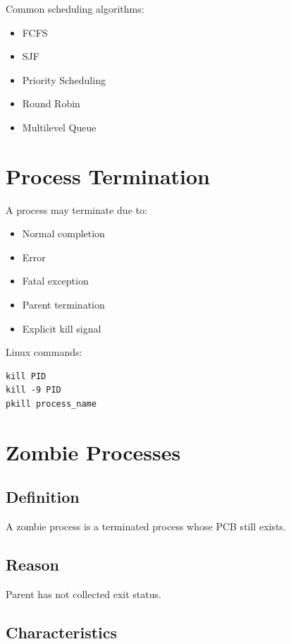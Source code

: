 Common scheduling algorithms:

\begin{itemize}
\item FCFS
\item SJF
\item Priority Scheduling
\item Round Robin
\item Multilevel Queue
\end{itemize}

\section{Process Termination}

A process may terminate due to:

\begin{itemize}
\item Normal completion
\item Error
\item Fatal exception
\item Parent termination
\item Explicit kill signal
\end{itemize}

Linux commands:

\begin{verbatim}
kill PID
kill -9 PID
pkill process_name
\end{verbatim}

\section{Zombie Processes}

\subsection{Definition}

A zombie process is a terminated process whose PCB still exists.

\subsection{Reason}

Parent has not collected exit status.

\subsection{Characteristics}

